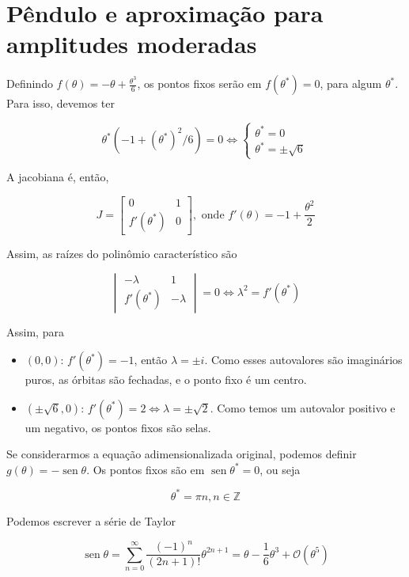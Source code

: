 \documentclass[9pt,a4paper]{tau-class/tau}
\DeclareMathOperator\sen{sen}
\theoremstyle{definition}
\numberwithin{definition}{subsection}
\numberwithin{theorem}{subsection}
\numberwithin{example}{subsection}
\numberwithin{observation}{subsection}
\numberwithin{lemma}{subsection}
\begin{document}
\section{Pêndulo e aproximação para amplitudes moderadas}

Definindo $f(\theta) = -\theta + \frac{\theta^3}{6}$, os pontos fixos serão em $f(\theta^*) = 0$, para algum $\theta^*$. Para isso, devemos ter 

\[\theta^*(-1 + (\theta^*)^2/6) = 0 \iff \begin{cases}
    \theta^* = 0 \\ 
    \theta^* = \pm \sqrt{6}
\end{cases}\]

A jacobiana é, então, 

\[J = \begin{bmatrix}
    0 & 1 \\ 
    f'(\theta^*) & 0 
\end{bmatrix}, \text{ onde }f'(\theta) = -1 + \frac{\theta^2}{2}\]
    
    Assim, as raízes do polinômio característico são 

    \[\begin{vmatrix}
        - \lambda & 1 \\ 
        f'(\theta^*) & -\lambda
    \end{vmatrix} = 0 \iff \lambda^2 = f'(\theta^*)\]

    Assim, para 

    \begin{itemize}
        \item $(0,0)$: $f'(\theta^*) = -1$, então $\lambda = \pm i$. Como esses autovalores são imaginários puros, as órbitas são fechadas, e o ponto fixo é um centro. 
        \item $(\pm\sqrt 6, 0)$: $f'(\theta^*) = 2 \iff \lambda = \pm\sqrt{2}$. Como temos um autovalor positivo e um negativo, os pontos fixos são selas. 
    \end{itemize}

    Se considerarmos a equação adimensionalizada original, podemos definir $g(\theta) = -\sen\theta$. Os pontos fixos são em $\sen\theta^* = 0$, ou seja 

    \[\theta^* = \pi n, n \in \mathbb{Z}\]

    Podemos escrever a série de Taylor

    \[\sen\theta = \sum_{n=0}^\infty \frac{(-1)^n}{(2n + 1)!}\theta^{2n + 1} = \theta - \frac{1}{6}\theta^3 + \mathcal{O}(\theta^5)\]
\end{document}
